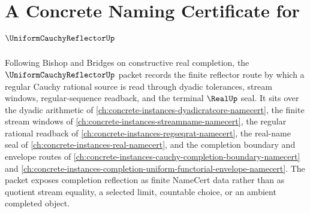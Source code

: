 \chapter{A Concrete Naming Certificate for $\UniformCauchyReflectorUp$}
\label{ch:concrete-instances-uniform-cauchy-reflector-namecert}

Following Bishop and Bridges on constructive real completion, the $\UniformCauchyReflectorUp$ packet records the finite reflector route by which a regular Cauchy rational source is read through dyadic tolerances, stream windows, regular-sequence readback, and the terminal $\RealUp$ seal. It sits over the dyadic arithmetic of \autoref{ch:concrete-instances-dyadicratcore-namecert}, the finite stream windows of \autoref{ch:concrete-instances-streamname-namecert}, the regular rational readback of \autoref{ch:concrete-instances-regseqrat-namecert}, the real-name seal of \autoref{ch:concrete-instances-real-namecert}, and the completion boundary and envelope routes of \autoref{ch:concrete-instances-cauchy-completion-boundary-namecert} and \autoref{ch:concrete-instances-completion-uniform-functorial-envelope-namecert}. The packet exposes completion reflection as finite NameCert data rather than as quotient stream equality, a selected limit, countable choice, or an ambient completed object.

